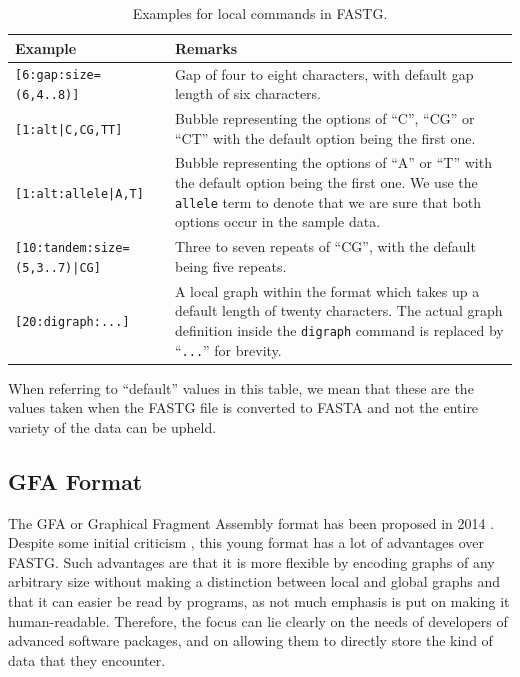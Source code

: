 \documentclass[a4paper,12pt,twoside,BCOR=10mm]{scrbook}
\begin{document}
\begin{table}[htb]
\centering
\caption[Local commands in FASTG]{Examples for local commands in FASTG.}
\begin{tabularx}{1.0\textwidth}{ | l | X | }
\hline
\textbf{Example} & \textbf{Remarks} \\
\hline
\texttt{[6:gap:size=(6,4..8)]} & Gap of four to eight characters, with default gap length of six characters. \\
\hline
\texttt{[1:alt|C,CG,TT]} & Bubble representing the options of “C”, “CG” or “CT” with the default option being the first one. \\
\hline
\texttt{[1:alt:allele|A,T]} & Bubble representing the options of “A” or “T” with the default option being the first one. We use the \texttt{allele} term to denote that we are sure that both options occur in the sample data. \\
\hline
\texttt{[10:tandem:size=(5,3..7)|CG]} & Three to seven repeats of “CG”, with the default being five repeats. \\
\hline
\texttt{[20:digraph:...]} & A local graph within the format which takes up a default length of twenty characters. The actual graph definition inside the \texttt{digraph} command is replaced by “\texttt{...}” for brevity. \\
\hline
\end{tabularx}
\label{table:fastg_local_examples}
\end{table}

When referring to “default” values in this table, we mean that these are the values taken when the FASTG file 
is converted to FASTA and not the entire variety of the data can be upheld.

\subsection{GFA Format}

The GFA or Graphical Fragment Assembly format 
has been proposed in 2014 \citep{specGFA1,specGFA2}. 
Despite some initial criticism \citep{knightGFA1}, 
this young format has a lot of advantages over FASTG. 
Such advantages are that 
it is more flexible by encoding graphs of any arbitrary size without 
making a distinction between local and global graphs and that it can easier be read by programs, 
as not much emphasis is put on making it human-readable. 
Therefore, the focus can lie clearly on the needs of developers of advanced software packages, 
and on allowing them to directly store the kind of data that they encounter.
\end{document}
